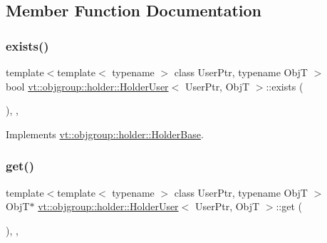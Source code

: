 \subsection{Member Function Documentation}
\mbox{\label{structvt_1_1objgroup_1_1holder_1_1_holder_user_abba92cc4a99e045b64a1865fe1477fb2}} 
\subsubsection{\texorpdfstring{exists()}{exists()}}
{\footnotesize\ttfamily template$<$template$<$ typename $>$ class User\+Ptr, typename ObjT $>$ \\
bool \hyperlink{structvt_1_1objgroup_1_1holder_1_1_holder_user}{vt\+::objgroup\+::holder\+::\+Holder\+User}$<$ User\+Ptr, ObjT $>$\+::exists (\begin{DoxyParamCaption}{ }\end{DoxyParamCaption})\hspace{0.3cm}{\ttfamily [inline]}, {\ttfamily [override]}, {\ttfamily [virtual]}}



Implements \hyperlink{structvt_1_1objgroup_1_1holder_1_1_holder_base_afeebbe358baf0b2bfea57f52807be564}{vt\+::objgroup\+::holder\+::\+Holder\+Base}.

\mbox{\label{structvt_1_1objgroup_1_1holder_1_1_holder_user_a102b494316b9f906a02f1c47b797e339}} 
\subsubsection{\texorpdfstring{get()}{get()}}
{\footnotesize\ttfamily template$<$template$<$ typename $>$ class User\+Ptr, typename ObjT $>$ \\
ObjT$\ast$ \hyperlink{structvt_1_1objgroup_1_1holder_1_1_holder_user}{vt\+::objgroup\+::holder\+::\+Holder\+User}$<$ User\+Ptr, ObjT $>$\+::get (\begin{DoxyParamCaption}{ }\end{DoxyParamCaption})\hspace{0.3cm}{\ttfamily [inline]}, {\ttfamily [override]}, {\ttfamily [virtual]}}



